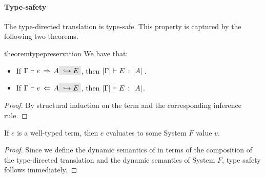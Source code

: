 \paragraph{Type-safety}
The type-directed translation is type-safe. This property is captured
by the following two theorems.

\begin{restatable}{theorem}{typepreservation}
  \label{theorem:type-preservation}
  We have that:
  \begin{itemize}
  \item If $ \jinfer \Gamma e A \yields E $, 
        then $ \lvert \Gamma \rvert \vdash E \ \!:\! \ \lvert A \rvert \,$.
  \item If $ \jcheck \Gamma e A \yields E $, 
        then $ \lvert \Gamma \rvert \vdash E \ \!:\! \ \lvert A \rvert $.
  \end{itemize}

\end{restatable}

\begin{proof}
  By structural induction on the term and the corresponding inference rule.
\end{proof}

\begin{theorem}
  If $e$ is a well-typed \name term, then $e$ evaluates to some System $F$
  value $v$.
\end{theorem}

\begin{proof}
  Since we define the dynamic semantics of \name in terms of the composition of
  the type-directed translation and the dynamic semantics of System $F$, type safety follows immediately.
\end{proof}

%
%
%




